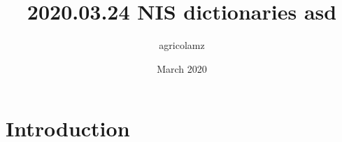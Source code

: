 \documentclass{article}
\title{2020.03.24 NIS dictionaries asd}
\author{agricolamz }
\date{March 2020}
\begin{document}
\maketitle

\section{Introduction}
\end{document}
